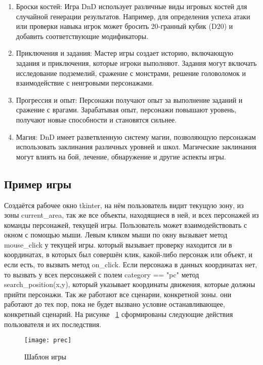 \begin{enumerate}
		\item Броски костей:
			 Игра DnD использует различные виды игровых костей для случайной генерации результатов. Например, для определения успеха атаки или проверки навыка игрок может бросить 20-гранный кубик (D20) и добавить соответствующие модификаторы.
		\item Приключения и задания:
			 Мастер игры создает историю, включающую задания и приключения, которые игроки выполняют. Задания могут включать исследование подземелий, сражение с монстрами, решение головоломок и взаимодействие с неигровыми персонажами.
		\item Прогрессия и опыт:
			Персонажи получают опыт за выполнение заданий и сражение с врагами. Зарабатывая опыт, персонажи повышают уровень, получают новые способности и становятся сильнее.
		\item Магия:
			DnD имеет разветвленную систему магии, позволяющую персонажам использовать заклинания различных уровней и школ. Магические заклинания могут влиять на бой, лечение, обнаружение и другие аспекты игры.
	\end{enumerate}
\subsection{Пример игры}
Создаётся рабочее окно tkinter, на нём пользователь видит текущую зону, из зоны current\_area, так же все объекты, находящиеся в ней, и всех персонажей из команды персонажей, текущей игры. Пользователь может взаимодействовать с окном с помощью мыши. Левым кликом мыши по окну вызывает метод mouse\_click у текущей игры. который вызывает проверку находится ли в координатах, в которых был совершён клик, какой-либо персонаж или объект, и если есть, то вызвать метод on\_click. Если персонажа в данных координатах нет, то вызвать у всех персонажей с полем category == "pc" метод search\_position(x,y), который указывает координаты движения, которые должны прийти персонажи. Так же работают все сценарии, конкретной зоны. они работают до тех пор, пока не будет вызвано условие останавливающее, конкретный сценарий.
На рисунке ~\ref{prec:image} сформированы следующие действия пользователя и их последствия.
\begin{figure}[ht]
	\texttt{[image: prec]}
	\caption{Шаблон игры}
	\label{prec:image}
\end{figure}

